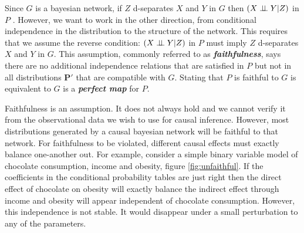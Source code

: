 \documentclass[11pt,a4paper]{article}
\begin{document}
Since $G$ is a bayesian network, if $Z$ d-separates $X$ and $Y$ in $G$ then $(X \perp\!\!\!\perp Y|Z)$ in $P$ . However, we want to work in the other direction, from conditional independence in the distribution to the structure of the network. This requires that we assume the reverse condition: $(X \perp\!\!\!\perp Y|Z)$ in $P$ must imply $Z$ d-separates $X$ and $Y$ in $G$. This assumption, commonly referred to as  \textbf{\textit{faithfulness}}, says there are no additional independence relations that are satisfied in $P$ but not in all distributions $\boldsymbol{P'}$ that are compatible with $G$. Stating that $P$ is faithful to $G$ is equivalent to $G$ is a \textbf{\textit{perfect map}} for $P$.

Faithfulness is an assumption. It does not always hold and we cannot verify it from the observational data we wish to use for causal inference. However, most distributions generated by a causal bayesian network will be faithful to that network. For faithfulness to be violated, different causal effects must exactly balance one-another out. For example, consider a simple binary variable model of chocolate consumption, income and obesity, figure \ref{fig:unfaithful}. If the coefficients in the conditional probability tables are just right then the direct effect of chocolate on obesity will exactly balance the indirect effect through income and obesity will appear independent of chocolate consumption. However, this independence is not stable. It would disappear under a small perturbation to any of the parameters.  
\end{document}
